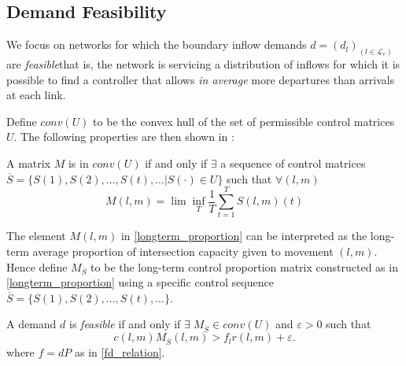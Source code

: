 \subsection*{Demand Feasibility}
We focus on networks for which the boundary inflow demands $d = (d_{l})_{(l\in \mathcal{L}_{e})}$ are \emph{feasible}\textemdash that is, the network is servicing a distribution of inflows for which it is possible to find a controller that allows \textit{in average} more departures than arrivals at each link. 

Define $conv(U)$ to be the convex hull of the set of permissible control matrices $U$. The following properties are then shown in \cite{MaxPressureStochastic}: 
\begin{Prop} A matrix 
$M$ is in $conv(U)$ if and only if $\exists$ a sequence of control matrices $\overline S = \{S(1),S(2),...,S(t),... \vert S(\cdot) \in U\}$ such that $\forall (l,m)$
\begin{equation}\label{longterm_proportion}
M(l,m) = \lim\inf_{T}\dfrac{1}{T}\sum_{t=1}^{T}S(l,m)(t)
\end{equation}
\end{Prop}
The element $M(l,m)$ in \eqref{longterm_proportion} can be interpreted as the long-term average proportion of intersection capacity given to movement $(l,m)$. Hence define $M_{\overline{S}}$ to be the long-term control proportion matrix constructed as in \eqref{longterm_proportion} using a specific control sequence $\overline{S} = \{S(1),S(2),...,S(t),...\}$. 
\begin{Prop} \label{feasible_property}
A demand $d$ is \emph{feasible} if and only if  $\exists \; M_{\overline S} \in conv(U)$ and $ \varepsilon > 0$ such that
 \begin{equation}  \label{feasible_demand} 
 c(l,m)M_{\overline S}(l,m) > f_{l}r(l,m) + \varepsilon. 
 \end{equation}
 where $f = dP$ as in \eqref{fd_relation}. 
\end{Prop}

